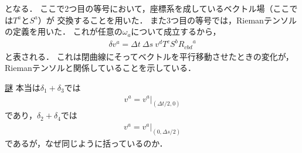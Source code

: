 \documentclass[a4paper]{jsarticle}
\begin{document}
となる．
ここで2つ目の等号において，座標系を成しているベクトル場（ここでは$T^a$と$S^a$）が
交換することを用いた．
また3つ目の等号では，Riemanテンソルの定義を用いた．
これが任意の$\omega_a$について成立するから，
\begin{align}
	\delta v^a =
	\Delta t \ \Delta s \ v^d T^c S^b {R_{cbd}}^a
\end{align}
と表される．
これは閉曲線にそってベクトルを平行移動させたときの変化が，
Riemanテンソルと関係していることを示している．
\begin{itembox}[l]{\underline{謎}}
	本当は$\delta_1 + \delta_3$では
	\begin{align}
		v^a = \left. v^a \right|_{(\Delta t/2, 0)}
	\end{align}
	であり，$\delta_2 + \delta_4$では
	\begin{align}
		v^a = \left. v^a \right|_{(0, \Delta s/2)}
	\end{align}
	であるが，なぜ同じように括っているのか．
\end{itembox}
\end{document}

